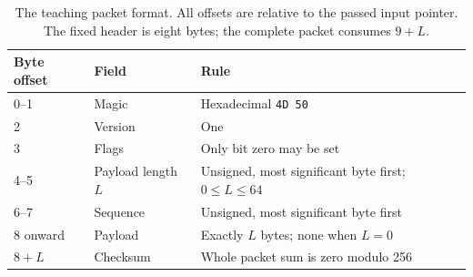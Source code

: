 \begin{table}[htbp]
  \centering
  \small
  \begin{tabular}{lll}
    \toprule
    Byte offset & Field              & Rule                                                   \\
    \midrule
    0--1        & Magic              & Hexadecimal \texttt{4D 50}                             \\
    2           & Version            & One                                                    \\
    3           & Flags              & Only bit zero may be set                               \\
    4--5        & Payload length $L$ & Unsigned, most significant byte first; $0\leq L\leq64$ \\
    6--7        & Sequence           & Unsigned, most significant byte first                  \\
    8 onward    & Payload            & Exactly $L$ bytes; none when $L=0$                     \\
    $8+L$       & Checksum           & Whole packet sum is zero modulo 256                    \\
    \bottomrule
  \end{tabular}
  \caption{The teaching packet format. All offsets are relative to the passed input pointer. The fixed header is eight bytes; the complete packet consumes $9+L$.}
  \label{tab:revision-bounded-format}
\end{table}
